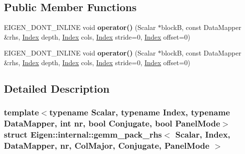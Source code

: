 \subsection*{Public Member Functions}
\begin{DoxyCompactItemize}
\item 
\mbox{\label{struct_eigen_1_1internal_1_1gemm__pack__rhs_3_01_scalar_00_01_index_00_01_data_mapper_00_01nr_00e5afdbaca90e394aa6e3c7b4d02529b6_adecc1d0ef7d3a37b141ab64bd56feaf0}} 
E\+I\+G\+E\+N\+\_\+\+D\+O\+N\+T\+\_\+\+I\+N\+L\+I\+NE void {\bfseries operator()} (Scalar $\ast$blockB, const Data\+Mapper \&rhs, \hyperlink{namespace_eigen_a62e77e0933482dafde8fe197d9a2cfde}{Index} depth, \hyperlink{namespace_eigen_a62e77e0933482dafde8fe197d9a2cfde}{Index} cols, \hyperlink{namespace_eigen_a62e77e0933482dafde8fe197d9a2cfde}{Index} stride=0, \hyperlink{namespace_eigen_a62e77e0933482dafde8fe197d9a2cfde}{Index} offset=0)
\item 
\mbox{\label{struct_eigen_1_1internal_1_1gemm__pack__rhs_3_01_scalar_00_01_index_00_01_data_mapper_00_01nr_00e5afdbaca90e394aa6e3c7b4d02529b6_adecc1d0ef7d3a37b141ab64bd56feaf0}} 
E\+I\+G\+E\+N\+\_\+\+D\+O\+N\+T\+\_\+\+I\+N\+L\+I\+NE void {\bfseries operator()} (Scalar $\ast$blockB, const Data\+Mapper \&rhs, \hyperlink{namespace_eigen_a62e77e0933482dafde8fe197d9a2cfde}{Index} depth, \hyperlink{namespace_eigen_a62e77e0933482dafde8fe197d9a2cfde}{Index} cols, \hyperlink{namespace_eigen_a62e77e0933482dafde8fe197d9a2cfde}{Index} stride=0, \hyperlink{namespace_eigen_a62e77e0933482dafde8fe197d9a2cfde}{Index} offset=0)
\end{DoxyCompactItemize}


\subsection{Detailed Description}
\subsubsection*{template$<$typename Scalar, typename Index, typename Data\+Mapper, int nr, bool Conjugate, bool Panel\+Mode$>$\newline
struct Eigen\+::internal\+::gemm\+\_\+pack\+\_\+rhs$<$ Scalar, Index, Data\+Mapper, nr, Col\+Major, Conjugate, Panel\+Mode $>$}



